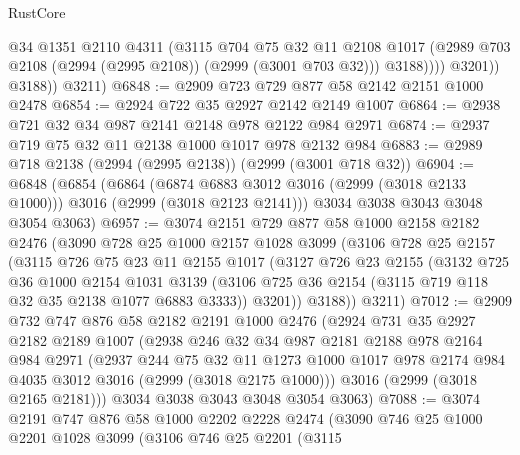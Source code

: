 \begin{lexlean}{RustCore}
\begin{coremodule}
                    @34
                    @1351
                    @2110
                    @4311
                    (@3115
                      @704
                      @75
                      @32
                      @11
                      @2108
                      @1017
                      (@2989 @703 @2108 (@2994 (@2995 @2108)) (@2999 (@3001 @703 @32)))
                      @3188))))
              @3201))
          @3188))
      @3211)
@6848 := @2909 @723 @729 @877 @58 @2142 @2151 @1000 @2478
@6854 := @2924 @722 @35 @2927 @2142 @2149 @1007
@6864 := @2938 @721 @32 @34 @987 @2141 @2148 @978 @2122 @984 @2971
@6874 := @2937 @719 @75 @32 @11 @2138 @1000 @1017 @978 @2132 @984
@6883 := @2989 @718 @2138 (@2994 (@2995 @2138)) (@2999 (@3001 @718 @32))
@6904 := @6848
    (@6854
      (@6864
        (@6874 @6883 @3012 @3016 (@2999 (@3018 @2133 @1000)))
        @3016
        (@2999 (@3018 @2123 @2141)))
      @3034
      @3038
      @3043
      @3048
      @3054
      @3063)
@6957 := @3074
    @2151
    @729
    @877
    @58
    @1000
    @2158
    @2182
    @2476
    (@3090
      @728
      @25
      @1000
      @2157
      @1028
      @3099
      (@3106
        @728
        @25
        @2157
        (@3115
          @726
          @75
          @23
          @11
          @2155
          @1017
          (@3127
            @726
            @23
            @2155
            (@3132
              @725
              @36
              @1000
              @2154
              @1031
              @3139
              (@3106 @725 @36 @2154 (@3115 @719 @118 @32 @35 @2138 @1077 @6883 @3333))
              @3201))
          @3188))
      @3211)
@7012 := @2909
    @732
    @747
    @876
    @58
    @2182
    @2191
    @1000
    @2476
    (@2924
      @731
      @35
      @2927
      @2182
      @2189
      @1007
      (@2938
        @246
        @32
        @34
        @987
        @2181
        @2188
        @978
        @2164
        @984
        @2971
        (@2937
          @244
          @75
          @32
          @11
          @1273
          @1000
          @1017
          @978
          @2174
          @984
          @4035
          @3012
          @3016
          (@2999 (@3018 @2175 @1000)))
        @3016
        (@2999 (@3018 @2165 @2181)))
      @3034
      @3038
      @3043
      @3048
      @3054
      @3063)
@7088 := @3074
    @2191
    @747
    @876
    @58
    @1000
    @2202
    @2228
    @2474
    (@3090
      @746
      @25
      @1000
      @2201
      @1028
      @3099
      (@3106
        @746
        @25
        @2201
        (@3115

\end{coremodule}
\end{lexlean}

